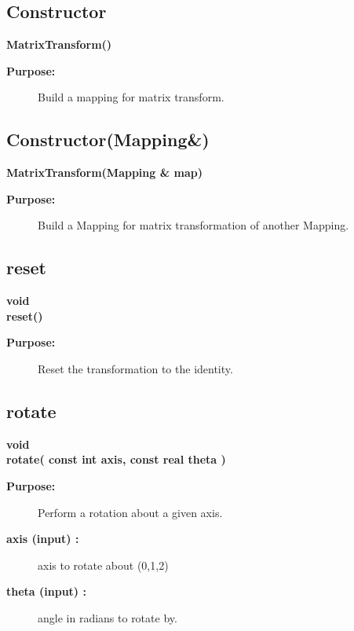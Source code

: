 \subsection{Constructor}
 
\newlength{\MatrixTransformIncludeArgIndent}
\begin{flushleft} \textbf{%
\settowidth{\MatrixTransformIncludeArgIndent}{MatrixTransform(}%
MatrixTransform() 
}\end{flushleft}
\begin{description}
\item[{\bf Purpose:}]  Build a mapping for matrix transform.
\end{description}
\subsection{Constructor(Mapping\&)}
 
\begin{flushleft} \textbf{%
\settowidth{\MatrixTransformIncludeArgIndent}{MatrixTransform(}%
MatrixTransform(Mapping \& map) 
}\end{flushleft}
\begin{description}
\item[{\bf Purpose:}]  Build a Mapping for matrix transformation of another Mapping.
\end{description}
\subsection{reset}
 
\begin{flushleft} \textbf{%
void  \\ 
\settowidth{\MatrixTransformIncludeArgIndent}{reset(}%
reset()
}\end{flushleft}
\begin{description}
\item[{\bf Purpose:}]  Reset the transformation to the identity.
\end{description}
\subsection{rotate}
 
\begin{flushleft} \textbf{%
void  \\ 
\settowidth{\MatrixTransformIncludeArgIndent}{rotate(}%
rotate( const int axis, const real theta )
}\end{flushleft}
\begin{description}
\item[{\bf Purpose:}]  Perform a rotation about a given axis.
\item[{\bf axis (input) :}]  axis to rotate about (0,1,2)
\item[{\bf theta (input) :}]  angle in radians to rotate by.
\end{description}

